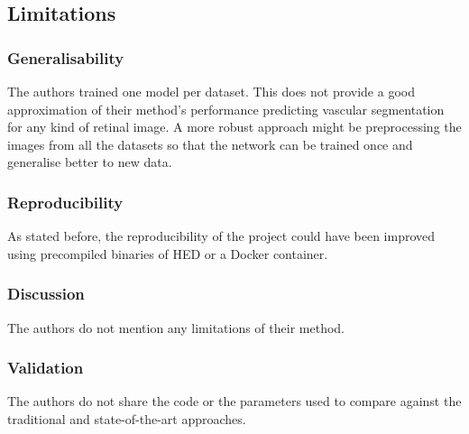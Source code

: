 \subsection{Limitations}

\subsubsection{Generalisability}
The authors trained one model per dataset. This does not provide a good approximation of their method's performance predicting vascular segmentation for any kind of retinal image. A more robust approach might be preprocessing the images from all the datasets so that the network can be trained once and generalise better to new data.

\subsubsection{Reproducibility}
As stated before, the reproducibility of the project could have been improved using precompiled binaries of HED or a Docker container.

\subsubsection{Discussion}
The authors do not mention any limitations of their method.

\subsubsection{Validation}
The authors do not share the code or the parameters used to compare against the traditional and state-of-the-art approaches.


